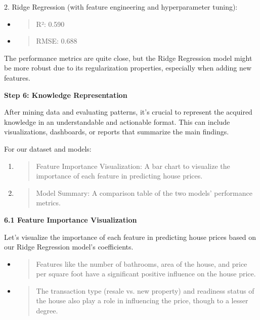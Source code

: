 \documentclass[]{article}
\newcommand{\textcenter}[1]{\begin{center} \vspace{10px}\textbf{\large #1} \end{center}}
\begin{document}
2. Ridge Regression (with feature engineering and hyperparameter
tuning):

\begin{itemize}
\item
  \begin{quote}
  R²: 0.590
  \end{quote}
\item
  \begin{quote}
  RMSE: 0.688
  \end{quote}
\end{itemize}

The performance metrics are quite close, but the Ridge Regression model
might be more robust due to its regularization properties, especially
when adding new features.

\textcenter{Step 6: Knowledge Representation}

After mining data and evaluating patterns, it's crucial to represent the
acquired knowledge in an understandable and actionable format. This can
include visualizations, dashboards, or reports that summarize the main
findings.

For our dataset and models:

\begin{enumerate}
\def\labelenumi{\arabic{enumi}.}
\item
  \begin{quote}
  Feature Importance Visualization: A bar chart to visualize the
  importance of each feature in predicting house prices.
  \end{quote}
\item
  \begin{quote}
  Model Summary: A comparison table of the two models' performance
  metrics.
  \end{quote}
\end{enumerate}

\textbf{6.1 Feature Importance Visualization}

Let's visualize the importance of each feature in predicting house
prices based on our Ridge Regression model's coefficients.

\begin{itemize}
\item
  \begin{quote}
  Features like the number of bathrooms, area of the house, and price
  per square foot have a significant positive influence on the house
  price.
  \end{quote}
\item
  \begin{quote}
  The transaction type (resale vs. new property) and readiness status of
  the house also play a role in influencing the price, though to a
  lesser degree.
  \end{quote}
\end{itemize}
\end{document}
